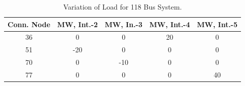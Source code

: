 \documentclass[preprint,12pt,3p]{elsarticle}
\begin{document}
\begin{table}[ht] 

\caption{Variation of Load for 118 Bus System.} %

\centering %

\begin{tabular}{| c | c | c | c | c |} %

\hline\hline %

Conn. Node & MW, Int.-2 & MW, In.-3 & MW, Int.-4  & MW, Int.-5 \\ [0.5ex] %


\hline %

36 &	0 &	0 &	20 &	0 \\ %
\hline
51 &	-20 &	0 &	0 &	0 \\ %
\hline
70 &	0 &	-10 &	0 &	0 \\ %
\hline
77 &	0 &	0 &	0 &	40 \\ %
\hline
\end{tabular} 

\label{table:118LASCOPFLoadModified} %

\end{table}
\end{document}
